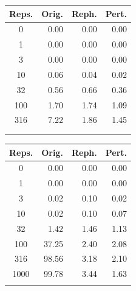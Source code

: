 \begin{table}[t!]
    \centering
    \begin{minipage}[t]{0.32\textwidth}
        \centering
        \setlength{\tabcolsep}{3.5pt}
        \begin{tabular}{crrr}
            \toprule
            \textbf{Reps.} & \textbf{Orig.} & \textbf{Reph.} & \textbf{Pert.} \\
            \midrule
            0    & 0.00 & 0.00 & 0.00 \\
            1    & 0.00 & 0.00 & 0.00 \\
            3    & 0.00 & 0.00 & 0.00 \\
            10   & 0.06 & 0.04 & 0.02 \\
            32   & 0.56 & 0.66 & 0.36 \\
            100  & 1.70 & 1.74 & 1.09 \\
            316  & 7.22 & 1.86 & 1.45 \\
            \phantom{0}\\
            \phantom{0}\\
            \bottomrule
        \end{tabular}
    \end{minipage}\hfill
    \begin{minipage}[t]{0.32\textwidth}
        \centering
        \setlength{\tabcolsep}{3.5pt}
        \begin{tabular}{crrr}
            \toprule
            \textbf{Reps.} & \textbf{Orig.} & \textbf{Reph.} & \textbf{Pert.} \\
            \midrule
            0    & 0.00 & 0.00 & 0.00 \\
            1    & 0.00 & 0.00 & 0.00 \\
            3    & 0.02 & 0.10 & 0.02 \\
            10   & 0.02 & 0.10 & 0.07 \\
            32   & 1.42 & 1.46 & 1.13 \\
            100  & 37.25 & 2.40 & 2.08 \\
            316  & 98.56 & 3.18 & 2.10 \\
            1000 & 99.78 & 3.44 & 1.63 \\
            \phantom{0}\\
            \bottomrule
        \end{tabular}
    \end{minipage}\hfill
    \begin{minipage}[t]{0.32\textwidth}

\end{minipage}
\end{table}

